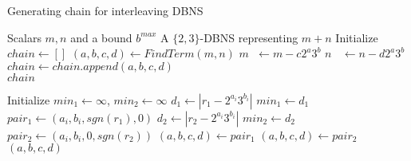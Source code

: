 \begin{algorithm}
\caption{Generating chain for interleaving DBNS}
\begin{algorithmic}
	\Require Scalars $m, n$ and a bound $b^{max}$
	\Ensure	A $\{2,3\}$-DBNS representing $m+n$
	\Statex
	\State Initialize $chain \gets [ ]$
		\State $(a,b,c,d) \gets FindTerm(m,n)$
		\State $m\phantom{n} \gets m - c2^a3^b$
		\State $n\phantom{m} \gets n - d2^a3^b$
		\State $chain \gets chain.append(a,b,c,d)$
	\EndWhile
	\\ \Return $chain$
\end{algorithmic}

\begin{algorithmic}
	\Statex
	\State Initialize $min_1 \gets \infty$, $min_2 \gets \infty$
		\State $d_1 \gets |r_1 - 2^{a_i}3^{b_i}|$
			\State $min_1 \gets d_1$
			\State $pair_1 \gets (a_i,b_i,sgn(r_1),0)$	
		\EndIf
		\State $d_2 \gets |r_2 - 2^{a_i}3^{b_i}|$
			\State $min_2 \gets d_2$
			\State $pair_2 \gets (a_i,b_i,0,sgn(r_2))$
		\EndIf
	\EndFor
		$(a,b,c,d) \gets pair_1$
	\Else
		$(a,b,c,d) \gets pair_2$
	\EndIf
	\\ \Return $(a,b,c,d)$
\end{algorithmic}

\label{interleaveDBNSChainAlgo}
\end{algorithm}




